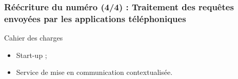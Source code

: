 \begin{frame}
	\frametitle{Réécriture du numéro (4/4) : Traitement des requêtes envoyées par les applications téléphoniques}

	\begin{block}{Cahier des charges}
	 \begin{itemize}
      \item Start-up ;
	  \item Service de mise en communication contextualisée.
	 \end{itemize}
	\end{block}
\end{frame}